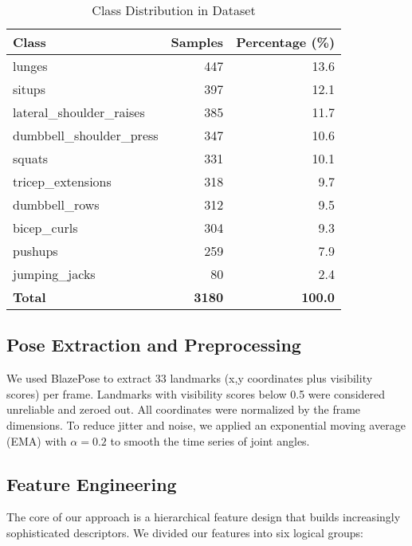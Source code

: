 \documentclass[conference]{IEEEtran}
\begin{document}
\begin{table}[ht]
\caption{Class Distribution in Dataset}
\label{tab:distribution}
\centering
\begin{tabular}{lrr}
\toprule
\textbf{Class} & \textbf{Samples} & \textbf{Percentage (\%)} \\
\midrule
lunges & 447 & 13.6 \\
situps & 397 & 12.1 \\
lateral\_shoulder\_raises & 385 & 11.7 \\
dumbbell\_shoulder\_press & 347 & 10.6 \\
squats & 331 & 10.1 \\
tricep\_extensions & 318 & 9.7 \\
dumbbell\_rows & 312 & 9.5 \\
bicep\_curls & 304 & 9.3 \\
pushups & 259 & 7.9 \\
jumping\_jacks & 80 & 2.4 \\
\midrule
\textbf{Total} & \textbf{3180} & \textbf{100.0} \\
\bottomrule
\end{tabular}
\end{table}

\subsection{Pose Extraction and Preprocessing}
We used BlazePose \cite{blazepose} to extract 33 landmarks (x,y coordinates plus visibility scores) per frame. Landmarks with visibility scores below 0.5 were considered unreliable and zeroed out. All coordinates were normalized by the frame dimensions. To reduce jitter and noise, we applied an exponential moving average (EMA) with $\alpha = 0.2$ to smooth the time series of joint angles.

\subsection{Feature Engineering}
The core of our approach is a hierarchical feature design that builds increasingly sophisticated descriptors. We divided our features into six logical groups:
\end{document}
